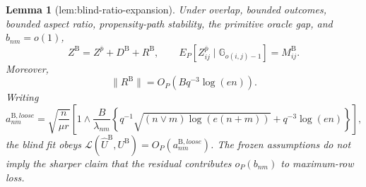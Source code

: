 \documentclass{article}
\newtheorem{lemma}{Lemma}
\begin{document}
\begin{lemma}[lem:blind-ratio-expansion]\label{lem:blind-ratio-expansion}
Under overlap, bounded outcomes, bounded aspect ratio, propensity-path stability, the primitive oracle gap, and \(b_{nm}=o(1)\),
\[
 Z^{\mathrm B}=Z^{\bar p}+D^{\mathrm B}+R^{\mathrm B},\qquad
 E_P[Z^{\bar p}_{ij}\mid\mathbb G_{o(i,j)-1}]=M^{\mathrm B}_{ij}.
\]
Moreover,
\[
 \lVert R^{\mathrm B}\rVert=O_P(Bq^{-3}\log(en)).
\]
Writing
\[
 a^{\mathrm B,loose}_{nm}=\sqrt{\frac n{\mu r}}\left[1\wedge
 \frac B{\lambda_{nm}}\left\{
 q^{-1}\sqrt{(n\vee m)\log(e(n+m))}+q^{-3}\log(en)
 \right\}\right],
\]
the blind fit obeys \(\mathcal L(\widehat U^{\mathrm B},U^{\mathrm B})=O_P(a^{\mathrm B,loose}_{nm})\).  The frozen assumptions do not imply the sharper claim that the residual contributes \(o_P(b_{nm})\) to maximum-row loss.
\end{lemma}
\end{document}
